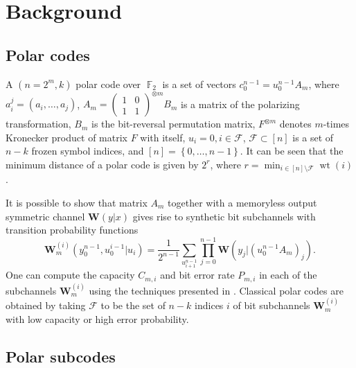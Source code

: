 \documentclass[conference]{IEEEtran}
\DeclareMathOperator{\F}{\mathbb F}
\DeclareMathOperator{\wt}{wt}
\theoremstyle{plain}
\newcommand{\mF}{\mathcal F}
\newcommand{\set}[1]{\left\{{#1}\right\}}
\begin{document}
\section{Background}
\label{sBackground}
\subsection{Polar codes}
A $(n=2^m,k)$ polar code over $\F_2$ is a set of vectors $c_0^{n-1}=u_0^{n-1}A_{m}$,  where $a_i^j=(a_i,\dots,a_j)$, $A_m=\begin{pmatrix}
1&0\\1&1
\end{pmatrix}^{\otimes m}B_m$ is a matrix of the polarizing transformation, $B_m$ is the bit-reversal permutation matrix,    $F^{\otimes m}$ denotes $m$-times Kronecker product of matrix $F$ with itself, $u_i=0, i\in \mF$,  $\mF\subset[n]$ is a set of $n-k$ frozen symbol indices, and $[n]=\set{0,\dots,n-1}$.
It can be seen that the minimum distance of a polar code is given by $2^r$, where $r=\min_{i\in [n]\setminus \mF} \wt(i)$. 


It is possible to show that  matrix $A_m$ together with a memoryless output symmetric channel $\mathbf W(y|x)$ gives rise to synthetic bit subchannels with transition probability functions $$\mathbf W_m^{(i)}(y_0^{n-1},u_0^{i-1}|u_i)=\frac{1}{2^{n-1}}\sum_{u_{i+1}^{n-1}}\prod_{j=0}^{n-1}\mathbf W(y_j|(u_0^{n-1}A_{m})_j).$$
One can compute the capacity $C_{m,i}$ and bit error rate $P_{m,i}$ in each of the subchannels $\mathbf W_m^{(i)}$ using the techniques presented in \cite{tal2011how,trifonov2012efficient}. Classical polar codes are obtained by taking $\mF$ to be the set of $n-k$ indices $i$ of bit subchannels $\mathbf W_m^{(i)}$ with low capacity or high error probability. 
\subsection{Polar subcodes}
\end{document}
